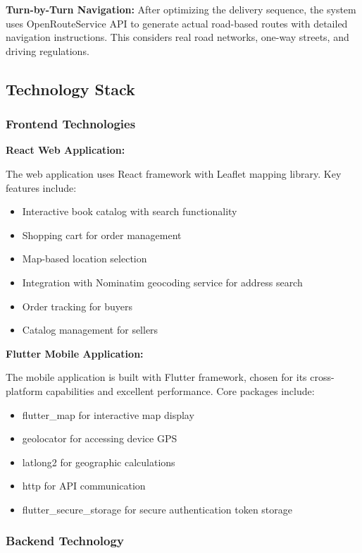 \documentclass[12pt,a4paper]{article}
\begin{document}
\textbf{Turn-by-Turn Navigation:} After optimizing the delivery sequence, the system uses OpenRouteService API to generate actual road-based routes with detailed navigation instructions. This considers real road networks, one-way streets, and driving regulations.

\subsection{Technology Stack}

\subsubsection{Frontend Technologies}

\textbf{React Web Application:}

The web application uses React framework with Leaflet mapping library. Key features include:
\begin{itemize}
    \item Interactive book catalog with search functionality
    \item Shopping cart for order management
    \item Map-based location selection
    \item Integration with Nominatim geocoding service for address search
    \item Order tracking for buyers
    \item Catalog management for sellers
\end{itemize}

\textbf{Flutter Mobile Application:}

The mobile application is built with Flutter framework, chosen for its cross-platform capabilities and excellent performance. Core packages include:
\begin{itemize}
    \item flutter\_map for interactive map display
    \item geolocator for accessing device GPS
    \item latlong2 for geographic calculations
    \item http for API communication
    \item flutter\_secure\_storage for secure authentication token storage
\end{itemize}

\subsubsection{Backend Technology}
\end{document}
